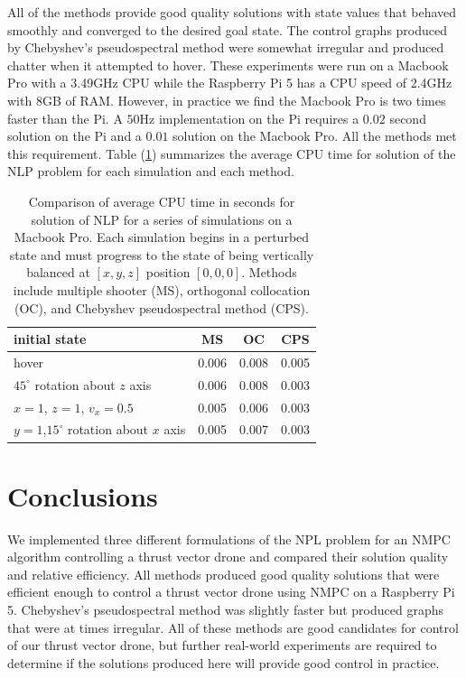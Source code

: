 \documentclass[]{article}
\begin{document}

All of the methods provide good quality solutions with state values that behaved smoothly and converged to the desired goal state.  The control graphs produced by Chebyshev's pseudospectral method were somewhat irregular and produced chatter when it attempted to hover.  These experiments were run on a Macbook Pro with a 3.49GHz CPU while the Raspberry Pi 5 has a CPU speed of 2.4GHz with 8GB of RAM.  However, in practice we find the Macbook Pro is two times faster than the Pi.  A $50$Hz implementation on the Pi requires  a $0.02$ second solution on the Pi and a $0.01$ solution on the Macbook Pro. All the methods met this requirement. Table (\ref{table:CPU}) summarizes the average CPU time for solution of the NLP problem for each simulation and each method.  


\begin{table}[h!]	
	\begin{center}
		\begin{tabular}{ | l | c | c | c | } 
			\hline
			initial state & MS & OC & CPS \\
			\hline
			hover &            0.006  & 0.008    & 0.005 \\ 
			$45^{\circ}$ rotation about $z$ axis &   0.006 & 0.008 &   0.003 \\ 
			$x = 1$, $z=1$, $v_x = 0.5$  &        0.005  & 0.006          &  0.003 \\ 
			$y = 1$,$15^{\circ}$ rotation about $x$ axis &      0.005 & 0.007          & 0.003 \\
			\hline
		\end{tabular}
		\caption{Comparison of average CPU time in seconds for solution of NLP for a series of simulations on a Macbook Pro. Each simulation begins in a perturbed state and must progress to the state of being vertically balanced at $[x,y,z]$ position $[0,0,0]$. Methods include  multiple shooter (MS), orthogonal collocation (OC), and Chebyshev pseudospectral method (CPS). }
		\label{table:CPU}
	\end{center}

\end{table}


\section*{Conclusions}
We implemented three different formulations of the NPL problem for an NMPC algorithm controlling a thrust vector drone and compared their solution quality and relative efficiency. All methods produced good quality solutions that were efficient enough to control a thrust  vector drone using NMPC  on a Raspberry Pi 5.  Chebyshev's pseudospectral method was slightly faster but produced graphs that were at times irregular.   All of these methods are good candidates for control of our thrust vector drone, but further real-world experiments are required to determine if the solutions produced here will provide good control in practice.


	
	
%	


\end{document}
